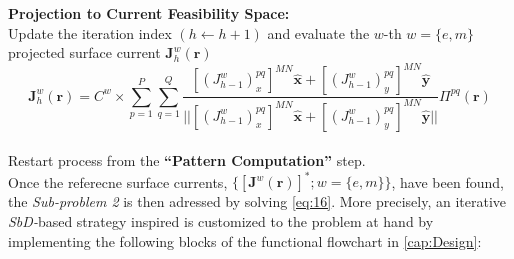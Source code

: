 \textbf{Projection to Current Feasibility Space:}\\
Update the iteration index $(h\leftarrow h+1)$ and evaluate the $w$-th
$w=\{ e,m\}$ projected surface current $\mathbf{J}_{h}^{w}(\mathbf{r})$\begin{equation}
\mathbf{J}_{h}^{w}(\mathbf{r})=C^{w}\times\sum_{p=1}^{P}\sum_{q=1}^{Q}\frac{[(J_{h-1}^{w})_{x}^{pq}]^{MN}\mathbf{\hat{x}}+[(J_{h-1}^{w})_{y}^{pq}]^{MN}\mathbf{\hat{y}}}{||[(J_{h-1}^{w})_{x}^{pq}]^{MN}\mathbf{\hat{x}}+[(J_{h-1}^{w})_{y}^{pq}]^{MN}\mathbf{\hat{y}}||}\Pi^{pq}(\mathbf{r})\label{eq:23}\end{equation}
\\
Restart process from the \textbf{{}``Pattern Computation''} step.\\
Once the referecne surface currents, $\{[\mathbf{J}^{w}(\mathbf{r})]^{*};w=\{ e,m\}\}$,
have been found, the \emph{Sub-problem 2} is then adressed by solving
\ref{eq:16}. More precisely, an iterative \emph{SbD-}based strategy
inspired is customized to the problem at hand by implementing the
following blocks of the functional flowchart in \ref{cap:Design}:

